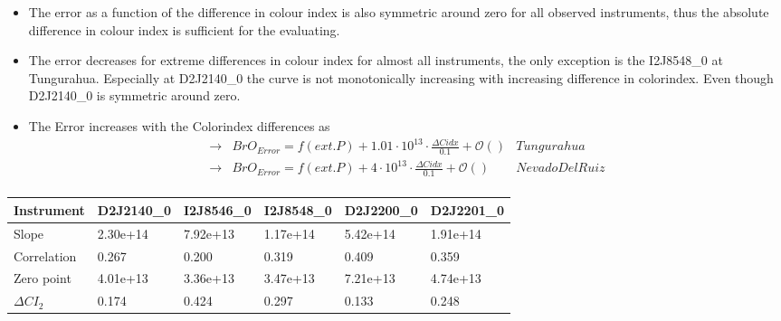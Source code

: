 \documentclass  [
  paper    = a4,
  BCOR     = 10mm,
  twoside,
  fontsize = 12pt,
  fleqn,
  toc      = bibnumbered,
  toc      = listofnumbered,
  numbers  = noendperiod,
  headings = normal,
  listof   = leveldown,
  version  = 3.03
]                                       {scrreprt}
\begin{document}
	\begin{itemize}
		\item The   error as a function of the difference in colour index is also symmetric around zero for all observed instruments, thus the absolute difference in colour index is sufficient for the evaluating.
		\item The   error decreases for extreme differences in colour index for almost all instruments, the only exception is the  I2J8548\_0 at Tungurahua. Especially at D2J2140\_0 the curve is not monotonically increasing with increasing difference in colorindex. Even though  D2J2140\_0 is symmetric around zero.
	\end{itemize}
	\begin{itemize}
		\item 	The  Error increases with the Colorindex differences as \\
		\begin{align*}
		\rightarrow&  BrO_{Error} = f(ext. P)+ 1.01\cdot10^{13}\cdot\frac{\Delta Cidx}{0.1} + \mathcal{O}\left(\right) & Tungurahua\\
		\rightarrow&  BrO_{Error} = f(ext. P)+  4\cdot10^{13}\cdot\frac{\Delta Cidx}{0.1} + \mathcal{O}\left(\right) & Nevado Del Ruiz\\
		\end{align*}
	\end{itemize}
	\begin{table}[h]
	\begin{tabular}{|p{2cm}|p{2cm}|p{2cm}|p{2cm}|p{2cm}|p{2cm}|}
			Instrument	&D2J2140\_0&I2J8546\_0& I2J8548\_0&D2J2200\_0&D2J2201\_0\\
			\toprule
			Slope&2.30e+14 &7.92e+13 &1.17e+14 &5.42e+14&1.91e+14\\
			\midrule
			Correlation&
			0.267&
			0.200&
			0.319&
			0.409&
			0.359\\
			\midrule
			Zero point&4.01e+13&3.36e+13&3.47e+13& 7.21e+13& 4.74e+13\\
						\midrule
			$\Delta CI_{2}$&0.174&0.424&0.297&0.133&0.248\\
			\bottomrule
		\end{tabular}
		\label{tab:colidxcalc}
	\end{table}
\end{document}
